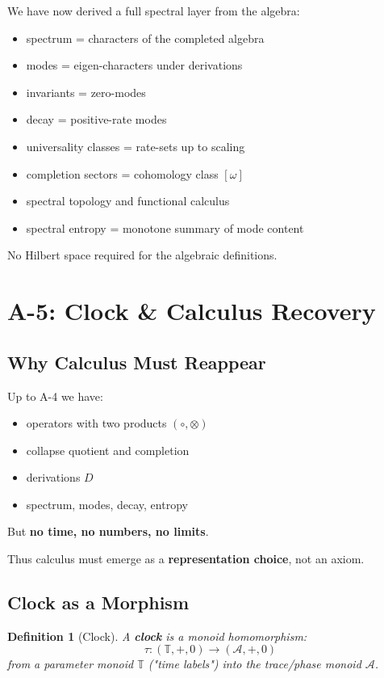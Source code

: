 \documentclass[12pt, oneside]{article}
\newtheorem{definition}[theorem]{Definition}
\newcommand{\A}{\mathcal{A}}
\begin{document}
We have now derived a full spectral layer from the algebra:
\begin{itemize}
    \item spectrum = characters of the completed algebra
    \item modes = eigen-characters under derivations
    \item invariants = zero-modes
    \item decay = positive-rate modes
    \item universality classes = rate-sets up to scaling
    \item completion sectors = cohomology class $[\omega]$
    \item spectral topology and functional calculus
    \item spectral entropy = monotone summary of mode content
\end{itemize}

No Hilbert space required for the algebraic definitions.

\newpage

\section{A-5: Clock \& Calculus Recovery}

\subsection{Why Calculus Must Reappear}

Up to A-4 we have:
\begin{itemize}
    \item operators with two products $(\circ, \otimes)$
    \item collapse quotient and completion
    \item derivations $D$
    \item spectrum, modes, decay, entropy
\end{itemize}
But \textbf{no time, no numbers, no limits}.

Thus calculus must emerge as a \textbf{representation choice}, not an axiom.

\subsection{Clock as a Morphism}

\begin{definition}[Clock]
A \textbf{clock} is a monoid homomorphism:
\begin{equation}
\tau: (\mathbb{T}, +, 0) \rightarrow (\A, +, 0)
\end{equation}
from a parameter monoid $\mathbb{T}$ ("time labels") into the trace/phase monoid $\A$.
\end{definition}
\end{document}
